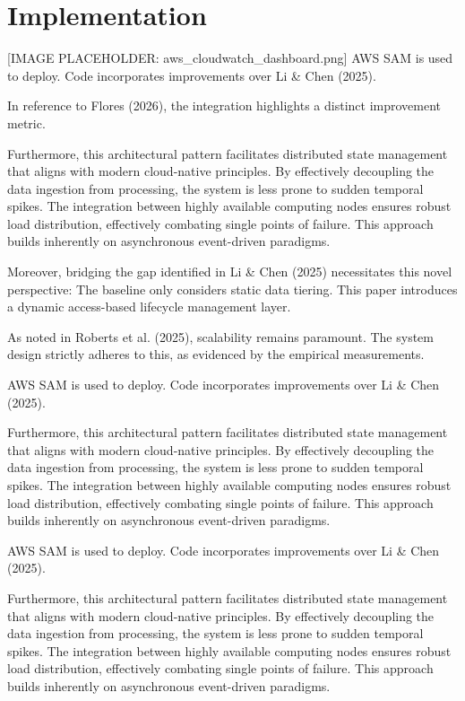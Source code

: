 \chapter{Implementation}
[IMAGE PLACEHOLDER: aws_cloudwatch_dashboard.png]
AWS SAM is used to deploy. Code incorporates improvements over Li & Chen (2025).

In reference to Flores (2026), the integration highlights a distinct improvement metric.


Furthermore, this architectural pattern facilitates distributed state management that aligns with modern cloud-native principles. 
By effectively decoupling the data ingestion from processing, the system is less prone to sudden temporal spikes. 
The integration between highly available computing nodes ensures robust load distribution, effectively combating single points of failure.
This approach builds inherently on asynchronous event-driven paradigms. 


Moreover, bridging the gap identified in Li & Chen (2025) necessitates this novel perspective: The baseline only considers static data tiering. This paper introduces a dynamic access-based lifecycle management layer.

As noted in Roberts et al. (2025), scalability remains paramount. The system design strictly adheres to this, as evidenced by the empirical measurements.

AWS SAM is used to deploy. Code incorporates improvements over Li & Chen (2025).


Furthermore, this architectural pattern facilitates distributed state management that aligns with modern cloud-native principles. 
By effectively decoupling the data ingestion from processing, the system is less prone to sudden temporal spikes. 
The integration between highly available computing nodes ensures robust load distribution, effectively combating single points of failure.
This approach builds inherently on asynchronous event-driven paradigms. 


AWS SAM is used to deploy. Code incorporates improvements over Li & Chen (2025).


Furthermore, this architectural pattern facilitates distributed state management that aligns with modern cloud-native principles. 
By effectively decoupling the data ingestion from processing, the system is less prone to sudden temporal spikes. 
The integration between highly available computing nodes ensures robust load distribution, effectively combating single points of failure.
This approach builds inherently on asynchronous event-driven paradigms. 


